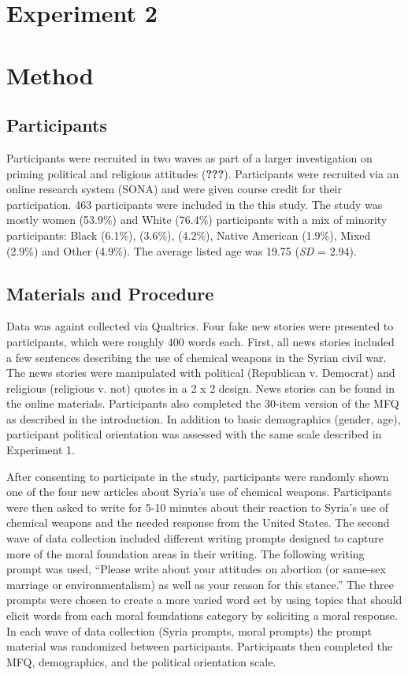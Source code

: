 \documentclass[english,man]{apa6}
\theoremstyle{definition}
\theoremstyle{definition}
\theoremstyle{definition}
\theoremstyle{remark}
\begin{document}
\section{Experiment 2}\label{experiment-2}

\section{Method}\label{method-1}

\subsection{Participants}\label{participants}

Participants were recruited in two waves as part of a larger
investigation on priming political and religious attitudes
({\textbf{???}}). Participants were recruited via an online research
system (SONA) and were given course credit for their participation. 463
participants were included in the this study. The study was mostly women
(53.9\%) and White (76.4\%) participants with a mix of minority
participants: Black (6.1\%), (3.6\%), (4.2\%), Native American (1.9\%),
Mixed (2.9\%) and Other (4.9\%). The average listed age was 19.75
(\emph{SD} = 2.94).

\subsection{Materials and Procedure}\label{materials-and-procedure-1}

Data was againt collected via Qualtrics. Four fake new stories were
presented to participants, which were roughly 400 words each. First, all
news stories included a few sentences describing the use of chemical
weapons in the Syrian civil war. The news stories were manipulated with
political (Republican v. Democrat) and religious (religious v. not)
quotes in a 2 x 2 design. News stories can be found in the online
materials. Participants also completed the 30-item version of the MFQ as
described in the introduction. In addition to basic demographics
(gender, age), participant political orientation was assessed with the
same scale described in Experiment 1.

After consenting to participate in the study, participants were randomly
shown one of the four new articles about Syria's use of chemical
weapons. Participants were then asked to write for 5-10 minutes about
their reaction to Syria's use of chemical weapons and the needed
response from the United States. The second wave of data collection
included different writing prompts designed to capture more of the moral
foundation areas in their writing. The following writing prompt was
used, \enquote{Please write about your attitudes on abortion (or
same-sex marriage or environmentalism) as well as your reason for this
stance.} The three prompts were chosen to create a more varied word set
by using topics that should elicit words from each moral foundations
category by soliciting a moral response. In each wave of data collection
(Syria prompts, moral prompts) the prompt material was randomized
between participants. Participants then completed the MFQ, demographics,
and the political orientation scale.
\end{document}
